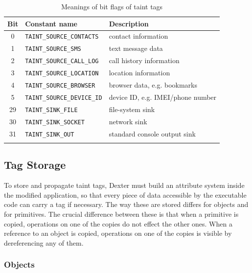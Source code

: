 \documentclass[12pt,twoside,notitlepage]{report}
\begin{document}
\begin{table}
	\begin{center}
	\begin{tabular}{|c|l|l|}
		\firsthline
		\textbf{Bit} & \textbf{Constant name}        & \textbf{Description} \\
		\hline
		0            & \verb$TAINT_SOURCE_CONTACTS$  & contact information \\
		1            & \verb$TAINT_SOURCE_SMS$       & text message data \\
		2            & \verb$TAINT_SOURCE_CALL_LOG$  & call history information \\
		3            & \verb$TAINT_SOURCE_LOCATION$  & location information \\
		4            & \verb$TAINT_SOURCE_BROWSER$   & browser data, e.g. bookmarks \\
		5            & \verb$TAINT_SOURCE_DEVICE_ID$ & device ID, e.g. IMEI/phone number \\
		\hline
		29           & \verb$TAINT_SINK_FILE$        & file-system sink \\
		30           & \verb$TAINT_SINK_SOCKET$      & network sink \\
		31           & \verb$TAINT_SINK_OUT$         & standard console output sink \\
		\lasthline
	\end{tabular}
	\end{center}
	\caption{Meanings of bit flags of taint tags}
	\label{table:TaintTagStorage_BitMeaning}
\end{table}

\subsection{Tag Storage}

To store and propagate taint tags, Dexter must build an attribute system inside the modified application, so that every piece of data accessible by the executable code can carry a tag if necessary. The way these are stored differs for objects and for primitives. The crucial difference between these is that when a primitive is copied, operations on one of the copies do not effect the other ones. When a reference to an object is copied, operations on one of the copies is visible by dereferencing any of them.

\subsubsection{Objects}
\end{document}

